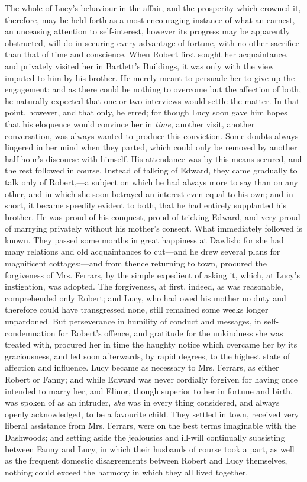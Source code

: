 The whole of Lucy's behaviour in the affair, and the prosperity which crowned it, therefore, may be held forth as a most encouraging instance of what an earnest, an unceasing attention to self-interest, however its progress may be apparently obstructed, will do in securing every advantage of fortune, with no other sacrifice than that of time and conscience. When Robert first sought her acquaintance, and privately visited her in Bartlett's Buildings, it was only with the view imputed to him by his brother. He merely meant to persuade her to give up the engagement; and as there could be nothing to overcome but the affection of both, he naturally expected that one or two interviews would settle the matter. In that point, however, and that only, he erred; for though Lucy soon gave him hopes that his eloquence would convince her in {\em time}, another visit, another conversation, was always wanted to produce this conviction. Some doubts always lingered in her mind when they parted, which could only be removed by another half hour's discourse with himself. His attendance was by this means secured, and the rest followed in course. Instead of talking of Edward, they came gradually to talk only of Robert,---a subject on which he had always more to say than on any other, and in which she soon betrayed an interest even equal to his own; and in short, it became speedily evident to both, that he had entirely supplanted his brother. He was proud of his conquest, proud of tricking Edward, and very proud of marrying privately without his mother's consent. What immediately followed is known. They passed some months in great happiness at Dawlish; for she had many relations and old acquaintances to cut---and he drew several plans for magnificent cottages;---and from thence returning to town, procured the forgiveness of Mrs. Ferrars, by the simple expedient of asking it, which, at Lucy's instigation, was adopted. The forgiveness, at first, indeed, as was reasonable, comprehended only Robert; and Lucy, who had owed his mother no duty and therefore could have transgressed none, still remained some weeks longer unpardoned. But perseverance in humility of conduct and messages, in self-condemnation for Robert's offence, and gratitude for the unkindness she was treated with, procured her in time the haughty notice which overcame her by its graciousness, and led soon afterwards, by rapid degrees, to the highest state of affection and influence. Lucy became as necessary to Mrs. Ferrars, as either Robert or Fanny; and while Edward was never cordially forgiven for having once intended to marry her, and Elinor, though superior to her in fortune and birth, was spoken of as an intruder, {\em she} was in every thing considered, and always openly acknowledged, to be a favourite child. They settled in town, received very liberal assistance from Mrs. Ferrars, were on the best terms imaginable with the Dashwoods; and setting aside the jealousies and ill-will continually subsisting between Fanny and Lucy, in which their husbands of course took a part, as well as the frequent domestic disagreements between Robert and Lucy themselves, nothing could exceed the harmony in which they all lived together.

